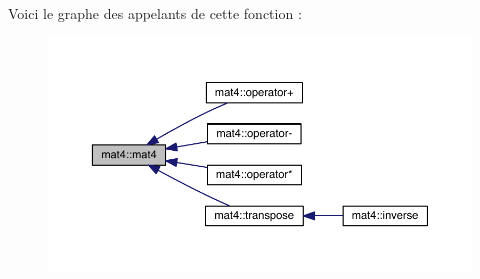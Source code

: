 Voici le graphe des appelants de cette fonction \+:
\nopagebreak
\begin{figure}[H]
\begin{center}
\leavevmode
\includegraphics[width=350pt]{structmat4_acf3f0c37ff5c16e8fb1bfdde2bf87a0f_icgraph}
\end{center}
\end{figure}


